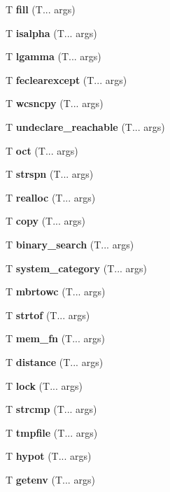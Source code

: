 \begin{DoxyCompactItemize}
T \textbf{ fill} (T... args)
\item 
\mbox{\label{isalpha}} 
T \textbf{ isalpha} (T... args)
\item 
\mbox{\label{lgamma}} 
T \textbf{ lgamma} (T... args)
\item 
\mbox{\label{feclearexcept}} 
T \textbf{ feclearexcept} (T... args)
\item 
\mbox{\label{wcsncpy}} 
T \textbf{ wcsncpy} (T... args)
\item 
\mbox{\label{undeclare_reachable}} 
T \textbf{ undeclare\+\_\+reachable} (T... args)
\item 
\mbox{\label{hex}} 
T \textbf{ oct} (T... args)
\item 
\mbox{\label{strspn}} 
T \textbf{ strspn} (T... args)
\item 
\mbox{\label{realloc}} 
T \textbf{ realloc} (T... args)
\item 
\mbox{\label{copy}} 
T \textbf{ copy} (T... args)
\item 
\mbox{\label{binary_search}} 
T \textbf{ binary\+\_\+search} (T... args)
\item 
\mbox{\label{system_category}} 
T \textbf{ system\+\_\+category} (T... args)
\item 
\mbox{\label{mbrtowc}} 
T \textbf{ mbrtowc} (T... args)
\item 
\mbox{\label{strtof}} 
T \textbf{ strtof} (T... args)
\item 
\mbox{\label{mem_fn}} 
T \textbf{ mem\+\_\+fn} (T... args)
\item 
\mbox{\label{distance}} 
T \textbf{ distance} (T... args)
\item 
\mbox{\label{lock}} 
T \textbf{ lock} (T... args)
\item 
\mbox{\label{strcmp}} 
T \textbf{ strcmp} (T... args)
\item 
\mbox{\label{tmpfile}} 
T \textbf{ tmpfile} (T... args)
\item 
\mbox{\label{hypot}} 
T \textbf{ hypot} (T... args)
\item 
\mbox{\label{getenv}} 
T \textbf{ getenv} (T... args)
\item 

\end{DoxyCompactItemize}
